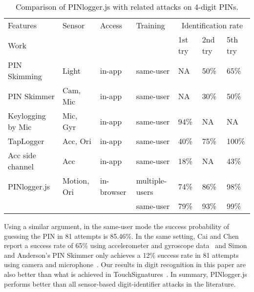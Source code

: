 \documentclass[10pt,twocolumn]{article}
\begin{document}
\begin{table*}[!t]
\centering
\begin{tabular}{|l|lll|lll|}
\hline
Features & Sensor & Access & Training & \multicolumn{3}{c|}{Identification rate} \\
Work&&  &  & 1st try & 2nd try & 5th try\\
\hline
PIN Skimming \cite{SkimLight} & Light& in-app & same-user& NA& 50\%& 65\%\\

PIN Skimmer \cite{PINCamera}& Cam, Mic& in-app& same-user & NA& 30\%& 50\%\\

Keylogging by Mic \cite{KeyMic} & Mic, Gyr& in-app & same-user& 94\%& NA & NA \\

TapLogger \cite{taplogger} & Acc, Ori& in-app& same-user& 40\%& 75\%& 100\%\\

Acc side channel \cite{Tapprints2} & Acc& in-app& same-user& 18\%& NA& 43\%\\

\hline
PINlogger.js &Motion, Ori& in-browser& multiple-users& 74\%& 86\%& 98\%\\
&& & same-user& 79\%& 93\%& 99\%\\
\hline
\end{tabular}
\caption {Comparison of PINlogger.js with related attacks on 4-digit PINs.} 
\label{compareall}
\end{table*}
Using a similar argument, in the same-user mode the success probability of guessing the PIN in 81 attempts is 85.46\%.
In the same setting, Cai and Chen report a success rate of 65\% using accelerometer and gyroscope data~\cite{Keystrokes} and Simon and Anderson's PIN Skimmer only achieves a 12\% success rate in 81 attempts using camera and microphone~\cite{PINCamera}.     
Our results in digit recognition in this paper are also better than what is achieved in TouchSignatures~\cite{Mehrnezhad}. 
In summary, PINlogger.js performs better than all sensor-based digit-identifier attacks in the literature. 
\end{document}
